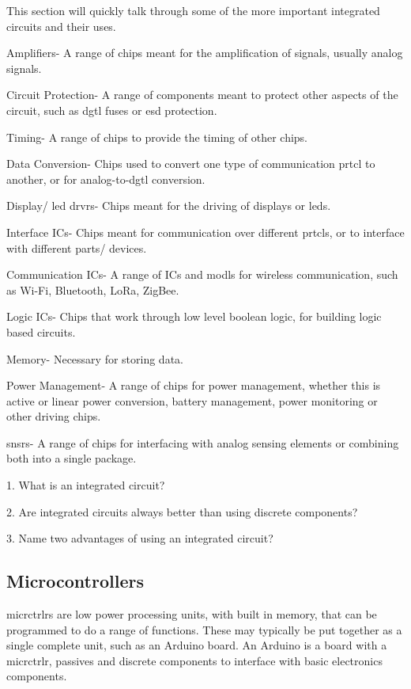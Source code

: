 \documentclass[a4paper,11pt]{report}
\newcommand{\Quiz}[1] %
{
\par\noindent %
\phantomsection %
\todo[inline, color=blue!30]{\textbf{#1}} %
\vspace{1em} %
}
\begin{document}
This section will quickly talk through some of the more important integrated circuits and their uses.

Amplifiers- A range of chips meant for the amplification of signals, usually analog signals.

Circuit Protection- A range of components meant to protect other aspects of the circuit, such as \gls{dgtl} fuses or \gls{esd} protection.

Timing- A range of chips to provide the timing of other chips.

Data Conversion- Chips used to convert one type of communication \gls{prtcl} to another, or for analog-to-\gls{dgtl} conversion.

Display/ \gls{led} \gls{drvr}s- Chips meant for the driving of displays or \gls{led}s.

Interface ICs- Chips meant for communication over different \gls{prtcl}s, or to interface with different parts/ devices.

Communication ICs- A range of ICs and \gls{modl}s for wireless communication, such as Wi-Fi, Bluetooth, LoRa, ZigBee.

Logic ICs- Chips that work through low level boolean logic, for building logic based circuits.

Memory- Necessary for storing data.

Power Management- A range of chips for power management, whether this is active or linear power conversion, battery management, power monitoring or other driving chips.

\gls{snsr}s- A range of chips for interfacing with analog sensing elements or combining both into a single package.

\Quiz{Quiz}

1. What is an integrated circuit?

2. Are integrated circuits always better than using discrete components?

3. Name two advantages of using an integrated circuit?

\vspace*{1\baselineskip}

\subsection{Microcontrollers}

\gls{micrctrlr}s are low power processing units, with built in memory, that can be programmed to do a range of functions. These may typically be put together as a single complete unit, such as an Arduino board. An Arduino is a board with a \gls{micrctrlr}, passives and discrete components to interface with basic electronics components.
\end{document}
